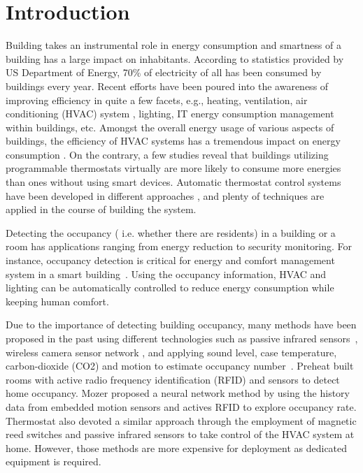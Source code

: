 \section{Introduction}
Building takes an instrumental role in energy consumption and
smartness of a building has a large impact on inhabitants. According
to statistics provided by US Department of Energy, 70\% of electricity
of all has been consumed by buildings every year. Recent efforts have
been poured into the awareness of improving efficiency in quite a few
facets, e.g., heating, ventilation, air conditioning (HVAC) system
\cite{10}\cite{12}, lighting\cite{8}, IT energy consumption management
within buildings\cite{1}\cite{2}, etc. Amongst the overall energy
usage of various aspects of buildings, the efficiency of HVAC systems
has a tremendous impact on energy consumption \cite{83}. On the
contrary, a few studies \cite{86} reveal that buildings utilizing
programmable thermostats virtually are more likely to consume more
energies than ones without using smart devices. Automatic thermostat
control systems have been developed in different approaches
\cite{87}\cite{88}, and plenty of techniques are applied in the course
of building the system.

Detecting the occupancy ( i.e. whether there are residents) in a
building or a room has applications ranging from energy reduction
to security monitoring.
For instance, occupancy detection is critical for energy and comfort management
system in a smart building~\cite{Nguyen2013Energy}.
Using the occupancy information, HVAC and lighting can be
automatically controlled to reduce energy consumption while keeping
human comfort.

Due to the importance of detecting building occupancy, many methods
have been proposed in the past using different technologies such as
passive infrared sensors~\cite{Dodier2006Building}, wireless camera sensor
network \cite{Erickson2009Energy}, and applying sound level, case
temperature, carbon-dioxide (CO2) and motion to estimate occupancy
number~\cite{Ekwevugbe2013Real}.  Preheat \cite{8.10} built rooms with
active radio frequency identification (RFID) and sensors to detect
home occupancy. Mozer \cite{8.9} proposed a neural network method by
using the history data from embedded motion sensors and actives RFID
to explore occupancy rate. Thermostat \cite{8.11} also devoted a
similar approach through the employment of magnetic reed switches and
passive infrared sensors to take control of the HVAC system at
home. However, those methods are more expensive for deployment as
dedicated equipment is required.


